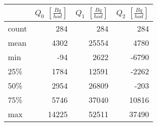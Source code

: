 \begin{tabular}{lrrr}
\toprule
{} &  $Q_0$ $\left[\si{\frac{Bq}{hod}}\right]$ &  $Q_1$ $\left[\si{\frac{Bq}{hod}}\right]$ &  $Q_2$ $\left[\si{\frac{Bq}{hod}}\right]$ \\
\midrule
count &                                       284 &                                       284 &                                       284 \\
mean  &                                      4302 &                                     25554 &                                      4780 \\
min   &                                       -94 &                                      2622 &                                     -6790 \\
25\%   &                                      1784 &                                     12591 &                                     -2262 \\
50\%   &                                      2954 &                                     26809 &                                      -203 \\
75\%   &                                      5746 &                                     37040 &                                     10816 \\
max   &                                     14225 &                                     52511 &                                     37490 \\
\bottomrule
\end{tabular}
